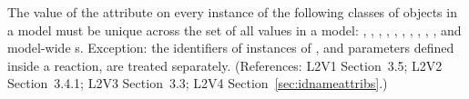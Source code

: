 The value of the  attribute on every instance of the
following classes of objects in a model must be unique
across the set of all  values in a model: \Model,
\FunctionDefinition, \CompartmentType, \SpeciesType,
\Compartment, \Species, \Reaction, \SpeciesReference,
\ModifierSpeciesReference, \Event, and model-wide \Parameter{}s.
Exception: the identifiers of instances of \UnitDefinition, and parameters defined
inside a reaction, are treated separately.  (References: L2V1
Section~3.5; L2V2 Section~3.4.1; L2V3 Section~3.3; L2V4 
Section~\ref{sec:idnameattribs}.)
